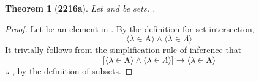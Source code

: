 \documentclass[preview]{standalone}
\newtheorem{theorem}{Theorem}
\begin{document}
\begin{theorem}[\textbf{2216a}]
    Let  and \bm{$\Lambda$} be sets. 
    .
\end{theorem}
\begin{proof}
    Let \bm{$\lambda$} be an element in . 
    By the definition for set intersection,
    \begin{equation*}
        \Big \langle \lambda \in \mathrm{A} \Big \rangle 
            \land 
        \Big \langle \lambda \in \Lambda \Big \rangle   
    \end{equation*}
    It trivially follows from the simplification rule of inference that 
    \begin{equation*}
        \bigg[
            \Big \langle \lambda \in \mathrm{A} \Big \rangle 
                \land 
            \Big \langle \lambda \in \Lambda \Big \rangle
        \bigg]
            \rightarrow
        \Big \langle \lambda \in \mathrm{A} \Big \rangle
    \end{equation*}
    $\therefore$ 
    , by the definition of subsets.
\end{proof}
\end{document}
